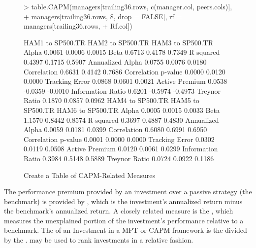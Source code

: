 \documentclass[12pt,letterpaper,english]{article}
\begin{document}
%
\begin{figure}

\caption{Create a Table of CAPM-Related Measures}

\label{fig:CAPM-Table}

\begin{Schunk}
\begin{Sinput}
> table.CAPM(managers[trailing36.rows, c(manager.col, peers.cols)], 
+     managers[trailing36.rows, 8, drop = FALSE], rf = managers[trailing36.rows, 
+         Rf.col])
\end{Sinput}
\begin{Soutput}
                    HAM1 to SP500.TR HAM2 to SP500.TR HAM3 to SP500.TR
Alpha                         0.0061           0.0006           0.0015
Beta                          0.6713           0.4178           0.7349
R-squared                     0.4397           0.1715           0.5907
Annualized Alpha              0.0755           0.0076           0.0180
Correlation                   0.6631           0.4142           0.7686
Correlation p-value           0.0000           0.0120           0.0000
Tracking Error                0.0868           0.0601           0.0021
Active Premium                0.0538          -0.0359          -0.0010
Information Ratio             0.6201          -0.5974          -0.4973
Treynor Ratio                 0.1870           0.0857           0.0962
                    HAM4 to SP500.TR HAM5 to SP500.TR HAM6 to SP500.TR
Alpha                         0.0005           0.0015           0.0033
Beta                          1.1570           0.8442           0.8574
R-squared                     0.3697           0.4887           0.4830
Annualized Alpha              0.0059           0.0181           0.0399
Correlation                   0.6080           0.6991           0.6950
Correlation p-value           0.0001           0.0000           0.0000
Tracking Error                0.0302           0.0119           0.0508
Active Premium                0.0120           0.0061           0.0299
Information Ratio             0.3984           0.5148           0.5889
Treynor Ratio                 0.0724           0.0922           0.1186
\end{Soutput}
\end{Schunk}
\end{figure}


The performance premium provided by an investment over a passive strategy
(the benchmark) is provided by ,
which is the investment's annualized return minus the benchmark's
annualized return. A closely related measure is the ,
which measures the unexplained portion of the investment's performance
relative to a benchmark. The 
of an Investment in a MPT or CAPM framework is the 
divided by the . 
may be used to rank investments in a relative fashion.
\end{document}
